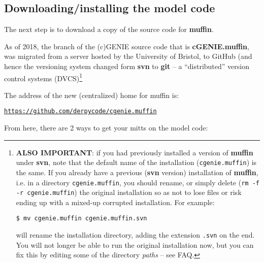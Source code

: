 \documentclass[11pt,fleqn]{book} %
\begin{document}

\subsection{Downloading/installing the model code}

The next step is to download a copy of the source code for \textbf{muffin}.

As of 2018, the branch of the (c)GENIE source code that is \textbf{cGENIE.muffin}, was migrated from a server hosted by the University of Bristol, to GitHub (and hence the versioning system changed form \textbf{svn} to \textbf{git} -- a “distributed” version control systems (DVCS)\footnote{\textbf{ALSO IMPORTANT}: if you had previously installed a version of \textbf{muffin} under \textbf{svn}, note that the default name of the installation (\texttt{cgenie.muffin}) is the same. If you already have a previous (\textbf{svn} version) installation of \textbf{muffin}, i.e. in a directory \texttt{cgenie.muffin}, you should rename, or simply delete (\texttt{rm -f -r cgenie.muffin}) the original installation so as not to lose files or risk ending up with a mixed-up corrupted installation. For example:

\texttt{\$ mv cgenie.muffin cgenie.muffin.svn}

\noindent will rename the installation directory, adding the extension \texttt{.svn} on the end. You will not longer be able to run the original installation now, but you can fix this by editing some of the directory \textit{paths} -- see FAQ.}

The address of the new (centralized) home for muffin is:

\vspace{1mm}
\href{https://github.com/derpycode/cgenie.muffin}{\texttt{https://github.com/derpycode/cgenie.muffin}}
\vspace{2mm}


From here, there are 2 ways to get your mitts on the model code:
\end{document}
